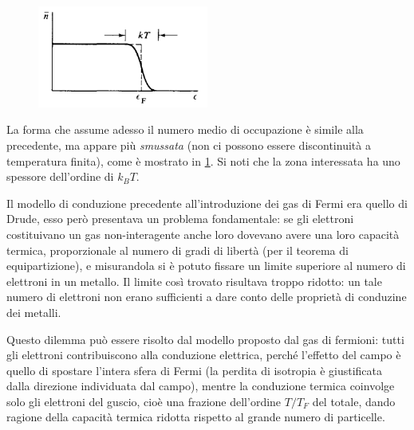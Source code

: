 \begin{figure}[h!]
	\centering
	\includegraphics[width=0.5\textwidth]{Immagini/FStepT.png}
	\caption{}
	\label{fig:fstepT}
\end{figure}

La forma che assume adesso il numero medio di occupazione è simile alla precedente, ma appare più \textit{smussata} (non ci possono essere discontinuità a temperatura finita), come è mostrato in \cref{fig:fstepT}. 
Si noti che la zona interessata ha uno spessore dell'ordine di $k_B T$.
\newline

Il modello di conduzione precedente all'introduzione dei gas di Fermi era quello di Drude, esso però presentava un problema fondamentale: se gli elettroni costituivano un gas non-interagente anche loro dovevano avere una loro capacità termica, proporzionale al numero di gradi di libertà (per il teorema di equipartizione), e misurandola si è potuto fissare un limite superiore al numero di elettroni in un metallo. Il limite così trovato risultava troppo ridotto: un tale numero di elettroni non erano sufficienti a dare conto delle proprietà di conduzine dei metalli.

Questo dilemma può essere risolto dal modello proposto dal gas di fermioni: tutti gli elettroni contribuiscono alla conduzione elettrica, perché l'effetto del campo è quello di spostare l'intera sfera di Fermi (la perdita di isotropia è giustificata dalla direzione individuata dal campo), mentre la conduzione termica coinvolge solo gli elettroni del guscio, cioè una frazione dell'ordine $T/T_F$ del totale, dando ragione della capacità termica ridotta rispetto al grande numero di particelle.

